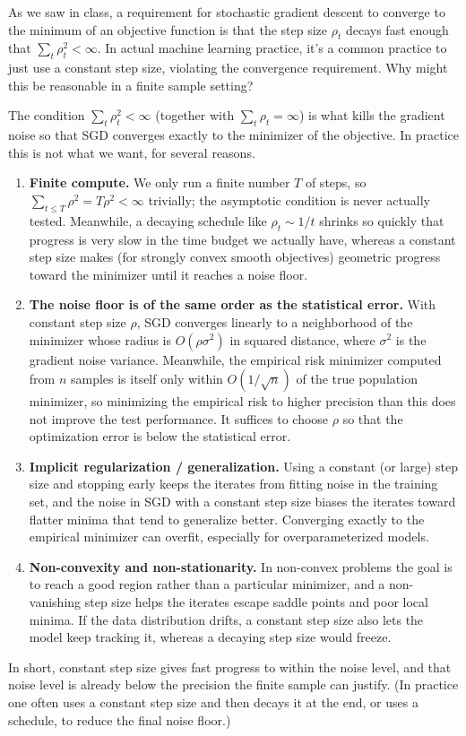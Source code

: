 \documentclass{article}
\newcounter{exercise}
\begin{document}
\begin{exercise}
  As we saw in class, a requirement for stochastic gradient descent to converge to the minimum of an objective function is that the step size $\rho_t$ decays fast enough that $\sum_t \rho_t^2 < \infty$. In actual machine learning practice, it's a common practice to just use a constant step size, violating the convergence requirement. Why might this be reasonable in a finite sample setting?
\end{exercise}
\begin{solution}
  The condition $\sum_t \rho_t^2 < \infty$ (together with $\sum_t \rho_t = \infty$) is what kills the gradient noise so that SGD converges exactly to the minimizer of the objective. In practice this is not what we want, for several reasons.
  \begin{enumerate}
    \item \textbf{Finite compute.} We only run a finite number $T$ of steps, so $\sum_{t \le T} \rho^2 = T\rho^2 < \infty$ trivially; the asymptotic condition is never actually tested. Meanwhile, a decaying schedule like $\rho_t \sim 1/t$ shrinks so quickly that progress is very slow in the time budget we actually have, whereas a constant step size makes (for strongly convex smooth objectives) geometric progress toward the minimizer until it reaches a noise floor.
    \item \textbf{The noise floor is of the same order as the statistical error.} With constant step size $\rho$, SGD converges linearly to a neighborhood of the minimizer whose radius is $O(\rho\sigma^2)$ in squared distance, where $\sigma^2$ is the gradient noise variance. Meanwhile, the empirical risk minimizer computed from $n$ samples is itself only within $O(1/\sqrt{n})$ of the true population minimizer, so minimizing the empirical risk to higher precision than this does not improve the test performance. It suffices to choose $\rho$ so that the optimization error is below the statistical error.
    \item \textbf{Implicit regularization / generalization.} Using a constant (or large) step size and stopping early keeps the iterates from fitting noise in the training set, and the noise in SGD with a constant step size biases the iterates toward flatter minima that tend to generalize better. Converging exactly to the empirical minimizer can overfit, especially for overparameterized models.
    \item \textbf{Non-convexity and non-stationarity.} In non-convex problems the goal is to reach a good region rather than a particular minimizer, and a non-vanishing step size helps the iterates escape saddle points and poor local minima. If the data distribution drifts, a constant step size also lets the model keep tracking it, whereas a decaying step size would freeze.
  \end{enumerate}
  In short, constant step size gives fast progress to within the noise level, and that noise level is already below the precision the finite sample can justify. (In practice one often uses a constant step size and then decays it at the end, or uses a schedule, to reduce the final noise floor.)
\end{solution}
\end{document}
